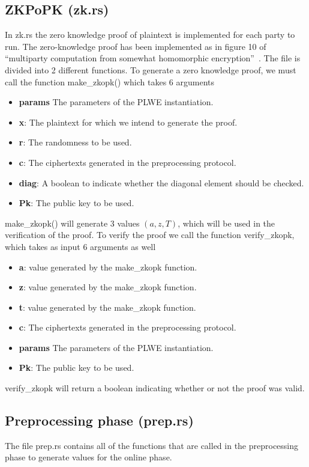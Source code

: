\documentclass[../main.tex]{subfiles}
\begin{document}
\subsection{ZKPoPK (zk.rs)}
In zk.rs the zero knowledge proof of plaintext is implemented for each party to run.
The zero-knowledge proof has been implemented as in figure 10 of ``multiparty computation from somewhat homomorphic encryption''~\cite{damgaard2012multiparty}.
The file is divided into 2 different functions.
To generate a zero knowledge proof, we must call the function make\_zkopk() which takes 6 arguments
\begin{itemize}
    \item \textbf{params} The parameters of the PLWE instantiation.
    \item \textbf{x}: The plaintext for which we intend to generate the proof.
    \item \textbf{r}: The randomness to be used.
    \item \textbf{c}: The ciphertexts generated in the preprocessing protocol.
    \item \textbf{diag}: A boolean to indicate whether the diagonal element should be checked.
    \item \textbf{Pk}: The public key to be used.
\end{itemize}
make\_zkopk() will generate 3 values $(a, z, T)$, which will be used in the verification of the proof.
To verify the proof we call the function verify\_zkopk, which takes as input 6 arguments as well
\begin{itemize}
    \item \textbf{a}: value generated by the make\_zkopk function.
    \item \textbf{z}: value generated by the make\_zkopk function.
    \item \textbf{t}: value generated by the make\_zkopk function.
    \item \textbf{c}: The ciphertexts generated in the preprocessing protocol.
    \item \textbf{params} The parameters of the PLWE instantiation.
    \item \textbf{Pk}: The public key to be used.
\end{itemize}
verify\_zkopk will return a boolean indicating whether or not the proof was valid.

\subsection{Preprocessing phase (prep.rs)}
The file prep.rs contains all of the functions that are called in the preprocessing phase to generate values for the online phase.
\end{document}

